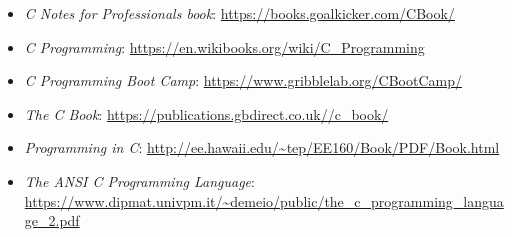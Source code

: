 \documentclass[]{book}
\providecommand{\tightlist}{%
  \setlength{\itemsep}{0pt}\setlength{\parskip}{0pt}}
\begin{document}
\begin{itemize}
\tightlist
\item
  \emph{C Notes for Professionals book}:
  \url{https://books.goalkicker.com/CBook/}
\item
  \emph{C Programming}:
  \url{https://en.wikibooks.org/wiki/C_Programming}
\item
  \emph{C Programming Boot Camp}:
  \url{https://www.gribblelab.org/CBootCamp/}
\item
  \emph{The C Book}: \url{https://publications.gbdirect.co.uk//c_book/}
\item
  \emph{Programming in C}:
  \url{http://ee.hawaii.edu/~tep/EE160/Book/PDF/Book.html}
\item
  \emph{The ANSI C Programming Language}:
  \url{https://www.dipmat.univpm.it/~demeio/public/the_c_programming_language_2.pdf}
\end{itemize}


\end{document}

